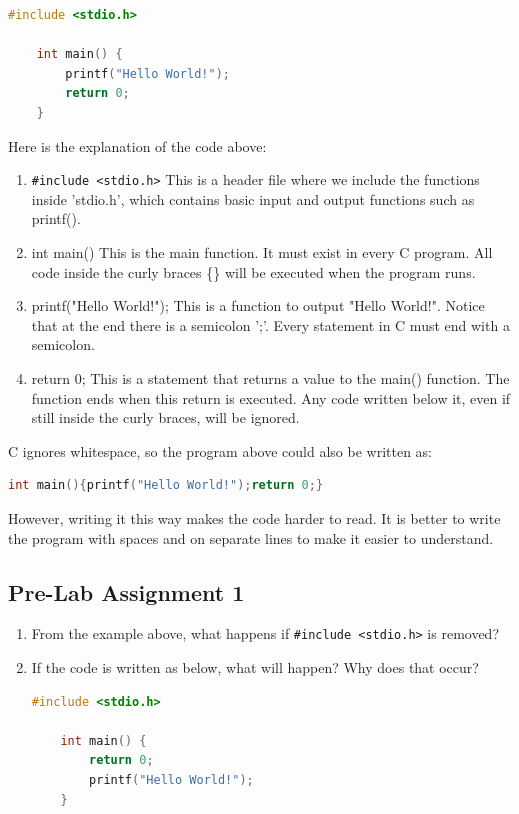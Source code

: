 \begin{lstlisting}[language=c,caption=Simple example program in C,label=lst:helloworld,captionpos=t]
	#include <stdio.h>

	int main() {
		printf("Hello World!");
		return 0;
	}
\end{lstlisting}
Here is the explanation of the code above:
\begin{enumerate}
	\item \verb|#include <stdio.h>|
	This is a header file where we include the functions inside 'stdio.h', which contains basic input and output functions such as printf().
	
	\item int main()
	This is the main function. It must exist in every C program.  
	All code inside the curly braces \{\} will be executed when the program runs.
	
	\item printf("Hello World!");
	This is a function to output "Hello World!".  
	Notice that at the end there is a semicolon ';'. Every statement in C must end with a semicolon.
	
	\item return 0;
	This is a statement that returns a value to the main() function.  
	The function ends when this return is executed. Any code written below it, even if still inside the curly braces, will be ignored.
\end{enumerate}
C ignores whitespace, so the program above could also be written as:
\begin{lstlisting}[language=c]
	int main(){printf("Hello World!");return 0;}
\end{lstlisting}
However, writing it this way makes the code harder to read.  
It is better to write the program with spaces and on separate lines to make it easier to understand.

\subsection*{Pre-Lab Assignment 1}
\begin{enumerate}
	\item From the example above, what happens if \verb|#include <stdio.h>| is removed?
  	\item If the code is written as below, what will happen? Why does that occur?
	\begin{lstlisting}[language=c]
	#include <stdio.h>

	int main() {
		return 0;
		printf("Hello World!");
	}
\end{lstlisting}
\end{enumerate}

